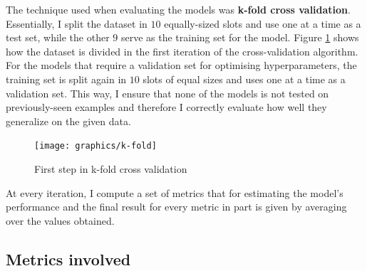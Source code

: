		The technique used when evaluating the models was \textbf{k-fold cross validation}. Essentially, I split the dataset in $10$ equally-sized slots and use one at a time as a test set, while the other $9$ serve as the training set for the model. Figure \ref{Fig: impl/ml/methodology/kfold/first} shows how the dataset is divided in the first iteration of the cross-validation algorithm. For the models that require a validation set for optimising hyperparameters, the training set is split again in $10$ slots of equal sizes and uses one at a time as a validation set. This way, I ensure that none of the models is not tested on previously-seen examples and therefore I correctly evaluate how well they generalize on the given data.
		\begin{figure}[H]
			\centering
			\texttt{[image: graphics/k-fold]}
			\caption{First step in k-fold cross validation}
			\label{Fig: impl/ml/methodology/kfold/first}
		\end{figure}
		
		At every iteration, I compute a set of metrics that for estimating the model's performance and the final result for every metric in part is given by averaging over the values obtained. 
	\subsection{Metrics involved} \label{Section: eval/ml/metrics}
	

